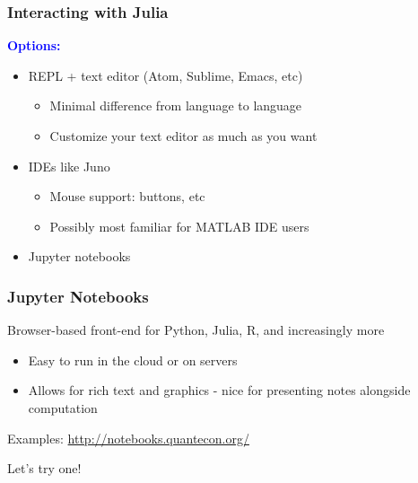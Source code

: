 \documentclass[
  xcolor={svgnames},
  hyperref={colorlinks,citecolor=DeepPink4,linkcolor=DarkRed,urlcolor=DarkBlue}
  ]{beamer}  %
\newcommand\boldblue[1]{\textcolor{blue}{\textbf{#1}}}
\begin{document}
\begin{frame}
  \frametitle{Interacting with Julia}

  \boldblue{Options:}

  \begin{itemize}
    \setlength\itemsep{1em}
    \item REPL + text editor (Atom, Sublime, Emacs, etc)
      \begin{itemize}
        \item Minimal difference from language to language
        \item Customize your text editor as much as you want
      \end{itemize}
      \pause
    \item IDEs like Juno
      \begin{itemize}
        \item Mouse support: buttons, etc
        \item Possibly most familiar for MATLAB IDE users
      \end{itemize}
      \pause
    \item Jupyter notebooks
  \end{itemize}
\end{frame}

\begin{frame}
  \frametitle{Jupyter Notebooks}

  Browser-based front-end for Python, Julia, R, and increasingly more

  \vspace{1em}
  \begin{itemize}
    \item Easy to run in the cloud or on servers
    \item Allows for rich text and graphics - nice for presenting notes alongside computation
  \end{itemize}
  \vspace{1em}
  Examples: \href{http://notebooks.quantecon.org/}{http://notebooks.quantecon.org/}

  \pause
  \vspace{1em}
  Let's try one!
\end{frame}
\end{document}
